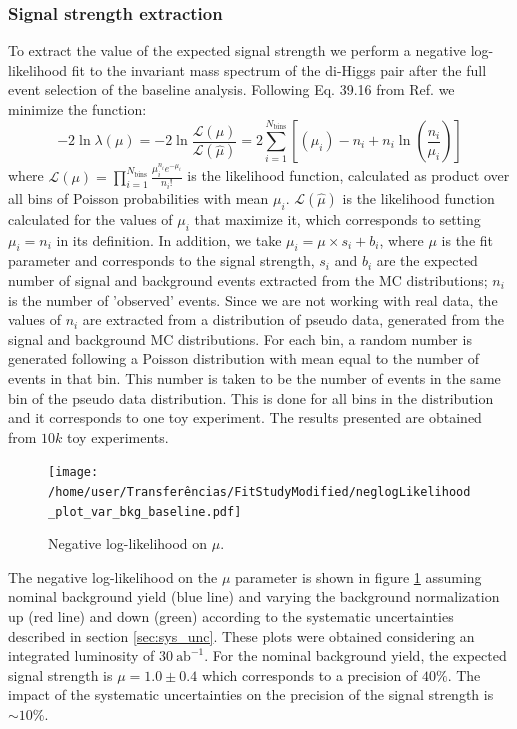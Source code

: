 \subsubsection{Signal strength extraction}

To extract the value of the expected signal strength we perform a negative log-likelihood fit to the invariant mass spectrum of the di-Higgs pair after the full event selection of the baseline analysis. Following Eq. 39.16 from Ref. \cite{PDG2016} we minimize the function:
\begin{equation}
-2\ln\lambda(\mu)=-2\ln\frac{\mathcal{L}(\mu)}{\mathcal{L}(\hat{\mu})}=2\sum_{i=1}^{N_{\text{bins}}}\left[(\mu_i)-n_i+n_i\ln\left(\frac{n_i}{\mu_i}\right)\right]
\end{equation}
where $\mathcal{L}(\mu)=\prod_{i=1}^{N_{\text{bins}}}\frac{\mu_i^{n_i}e^{-\mu_i}}{n_i!}$ is the likelihood function, calculated as product over all bins of Poisson probabilities with mean $\mu_i$. $\mathcal{L}(\hat{\mu})$ is the likelihood function calculated for the values of $\mu_i$ that maximize it, which corresponds to setting $\mu_i=n_i$ in its definition. In addition, we take $\mu_i=\mu\times s_i+b_i$, where $\mu$ is the fit parameter and corresponds to the signal strength, $s_i$ and $b_i$ are the expected number of signal and background events extracted from the MC distributions; $n_i$ is the number of 'observed' events. Since we are not working with real data, the values of $n_i$ are extracted from a distribution of pseudo data, generated from the signal and background MC distributions. For each bin, a random number is generated following a Poisson distribution with mean equal to the number of events in that bin. This number is taken to be the number of events in the same bin of the pseudo data distribution. This is done for all bins in the distribution and it corresponds to one toy experiment. The results presented are obtained from $10k$ toy experiments.

\begin{figure}
	\centering
	\texttt{[image: /home/user/Transferências/FitStudyModified/neglogLikelihood\_plot\_var\_bkg\_baseline.pdf]}
	\caption{\label{fig:lumi}Negative log-likelihood on $\mu$.}
\end{figure}

The negative log-likelihood on the $\mu$ parameter is shown in figure \ref{fig:lumi} assuming nominal background yield (blue line) and varying the background normalization up (red line) and down (green) according to the systematic uncertainties described in section \ref{sec:sys_unc}. These plots were obtained considering an integrated luminosity of $30~\text{ab}^{-1}$. For the nominal background yield, the expected signal strength is $\mu=1.0\pm 0.4$ which corresponds to a precision of $40\%$. The impact of the systematic uncertainties on the precision of the signal strength is $\sim 10\%$. 

